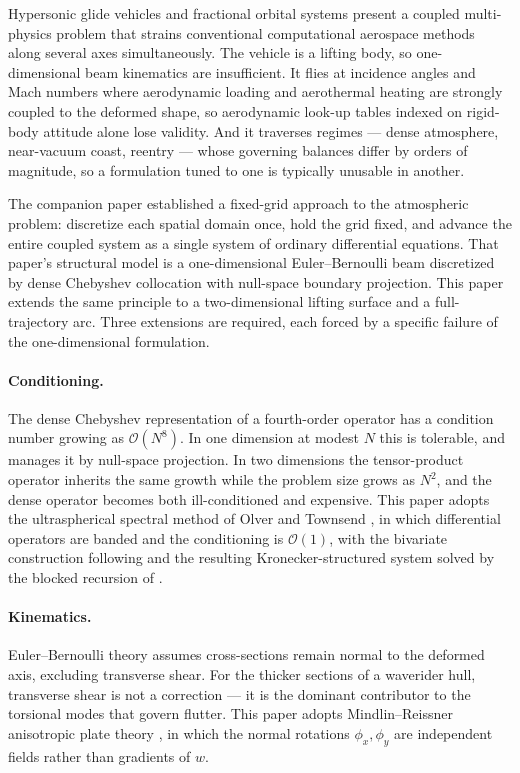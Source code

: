 \documentclass[11pt,a4paper]{article}
\theoremstyle{definition}
\numberwithin{equation}{section}
\begin{document}
Hypersonic glide vehicles and fractional orbital systems present a coupled multi-physics problem that strains conventional computational aerospace methods along several axes simultaneously. The vehicle is a lifting body, so one-dimensional beam kinematics are insufficient. It flies at incidence angles and Mach numbers where aerodynamic loading and aerothermal heating are strongly coupled to the deformed shape, so aerodynamic look-up tables indexed on rigid-body attitude alone lose validity. And it traverses regimes --- dense atmosphere, near-vacuum coast, reentry --- whose governing balances differ by orders of magnitude, so a formulation tuned to one is typically unusable in another.

The companion paper \cite{knox2026passes} established a fixed-grid approach to the atmospheric problem: discretize each spatial domain once, hold the grid fixed, and advance the entire coupled system as a single system of ordinary differential equations. That paper's structural model is a one-dimensional Euler--Bernoulli beam discretized by dense Chebyshev collocation with null-space boundary projection. This paper extends the same principle to a two-dimensional lifting surface and a full-trajectory arc. Three extensions are required, each forced by a specific failure of the one-dimensional formulation.

\paragraph{Conditioning.} The dense Chebyshev representation of a fourth-order operator has a condition number growing as $\mathcal{O}(N^8)$. In one dimension at modest $N$ this is tolerable, and \cite{knox2026passes} manages it by null-space projection. In two dimensions the tensor-product operator inherits the same growth while the problem size grows as $N^2$, and the dense operator becomes both ill-conditioned and expensive. This paper adopts the ultraspherical spectral method of Olver and Townsend \cite{olver2013}, in which differential operators are banded and the conditioning is $\mathcal{O}(1)$, with the bivariate construction following \cite{townsend2015} and the resulting Kronecker-structured system solved by the blocked recursion of \cite{chen2020}.

\paragraph{Kinematics.} Euler--Bernoulli theory assumes cross-sections remain normal to the deformed axis, excluding transverse shear. For the thicker sections of a waverider hull, transverse shear is not a correction --- it is the dominant contributor to the torsional modes that govern flutter. This paper adopts Mindlin--Reissner anisotropic plate theory \cite{mindlin1951, reissner1945}, in which the normal rotations $\phi_x, \phi_y$ are independent fields rather than gradients of $w$.
\end{document}
